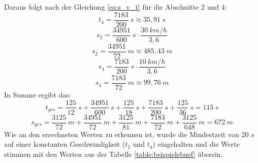 Daraus folgt nach der Gleichung \ref{eq:s_v_t} für die Abschnitte 2 und 4:
\[t_{4} = \frac{7183}{200}\:s \approx 35,91\:s\]
\[s_{2} = \frac{34951}{600}\:s \cdot \frac{30\:km/h}{3,6}\]
\[s_{2} = \frac{34951}{72}\:m \approx 485,43\:m\]
\[s_{4} = \frac{7183}{200}\:s \cdot \frac{10\:km/h}{3,6}\]
\[s_{4} = \frac{7183}{72}\:m \approx 99,76\:m\]
In Summe ergibt das:
\[t_{ges} = \frac{125}{12}\:s + \frac{34951}{600}\:s + \frac{125}{18}\:s + \frac{7183}{200}\:s + \frac{125}{36}\:s = 115\:s\]
\[s_{ges} = \frac{3125}{72}\:m + \frac{34951}{72}\:m + \frac{3125}{81}\:m + \frac{7183}{72}\:m + \frac{3125}{648}\:m = 672\:m\]
Wie an den errechneten Werten zu erkennen ist, wurde die Mindestzeit von 20 $s$ auf einer konstanten Geschwindigkeit ($t_2$ und $t_4$) eingehalten und die Werte stimmen mit den Werten aus der Tabelle \ref{table:beispielebuef} überein.